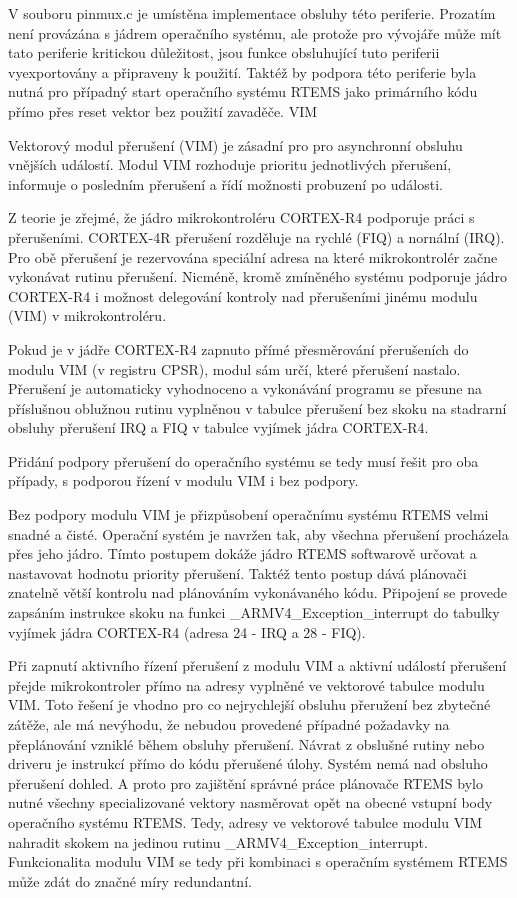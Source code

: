 V souboru pinmux.c je umístěna implementace obsluhy této periferie.
Prozatím není provázána s jádrem operačního systému, ale protože pro vývojáře může mít tato periferie kritickou důležitost, jsou funkce obsluhující tuto periferii vyexportovány a připraveny k použití.
Taktéž by podpora této periferie byla nutná pro případný start operačního systému RTEMS jako primárního kódu přímo přes reset vektor bez použití zavaděče.
\secc	VIM

Vektorový modul přerušení (VIM) je zásadní pro pro asynchronní obsluhu vnějších událostí.
Modul VIM rozhoduje prioritu jednotlivých přerušení, informuje o posledním přerušení a řídí možnosti probuzení po události.

Z teorie je zřejmé, že jádro mikrokontroléru CORTEX-R4 podporuje práci s přerušeními.
CORTEX-4R přerušení rozděluje na rychlé (FIQ) a nornální (IRQ).
Pro obě přerušení je rezervována speciální adresa na které mikrokontrolér začne vykonávat rutinu přerušení.
Nicméně, kromě zmíněného systému podporuje jádro CORTEX-R4 i možnost delegování kontroly nad přerušeními jinému modulu (VIM) v mikrokontroléru.

Pokud je v jádře CORTEX-R4 zapnuto přímé přesměrování přerušeních do modulu VIM (v registru CPSR), modul sám určí, které přerušení nastalo.
Přerušení je automaticky vyhodnoceno a vykonávání programu se přesune na příslušnou oblužnou rutinu vyplněnou v tabulce přerušení bez skoku na stadrarní obsluhy přerušení IRQ a FIQ v tabulce vyjímek jádra CORTEX-R4.

Přidání podpory přerušení do operačního systému se tedy musí řešit pro oba případy, s podporou řízení v modulu VIM i bez podpory.

Bez podpory modulu VIM je přizpůsobení operačnímu systému RTEMS velmi snadné a čisté.
Operační systém je navržen tak, aby všechna přerušení procházela přes jeho jádro.
Tímto postupem dokáže jádro RTEMS softwarově určovat a nastavovat hodnotu priority přerušení.
Taktéž tento postup dává plánovači znatelně větší kontrolu nad plánováním vykonávaného kódu.
Připojení se provede zapsáním instrukce skoku na funkci \_ARMV4\_Exception\_interrupt do tabulky vyjímek jádra CORTEX-R4 (adresa 24 - IRQ a 28 - FIQ).

Při zapnutí aktivního řízení přerušení z modulu VIM a aktivní událostí přerušení přejde mikrokontroler přímo na adresy vyplněné ve vektorové tabulce modulu VIM.
Toto řešení je vhodno pro co nejrychlejší obsluhu přeružení bez zbytečné zátěže, ale má nevýhodu, že nebudou provedené případné požadavky na přeplánování vzniklé během obsluhy přerušení.
Návrat z obslušné rutiny nebo driveru je instrukcí přímo do kódu přerušené úlohy. Systém nemá nad obsluho přerušení dohled.
A proto pro zajištění správné práce plánovače RTEMS bylo nutné všechny specializované vektory nasměrovat opět na obecné vstupní body operačního systému RTEMS.
Tedy, adresy ve vektorové tabulce modulu VIM nahradit skokem na jedinou rutinu \_ARMV4\_Exception\_interrupt.
Funkcionalita modulu VIM se tedy při kombinaci s operačním systémem RTEMS může zdát do značné míry redundantní.

